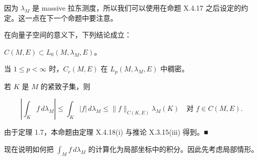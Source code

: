 因为 $ \lambda_M $ 是 massive 拉东测度，所以我们可以使用在命题 X.4.17 之后设定的约定。这一点在下一个命题中要注意。

\begin{proposition}

\begin{items}
\item

在向量子空间的意义下，下列结论成立：

\begin{subitems}
\item

$ C(M, E) \subset L_0(M, \lambda_M, E) $。

\item

当 $ 1 \le p < \infty $ 时，$ C_c(M, E) $ 在 $ L_p(M, \lambda_M, E) $ 中稠密。

\end{subitems}

\item

若 $ K $ 是 $ M $ 的紧致子集，则

\[
\left|\int_K f \, d\lambda_M\right| \le \int_K |f| \, d\lambda_M \le \|f\|_{C(K,E)} \lambda_M(K) \quad \text{对 } f \in C(M, E) .
\]

\proofhead
由于定理 1.7，本命题由定理 X.4.18(i) 与推论 X.3.15(iii) 得到。\nobreak\hspace{0.35em}■
\end{items}

\end{proposition}

现在说明如何把 $ \int_M f \, d\lambda_M $ 的计算化为局部坐标中的积分。因此先考虑局部情形。

